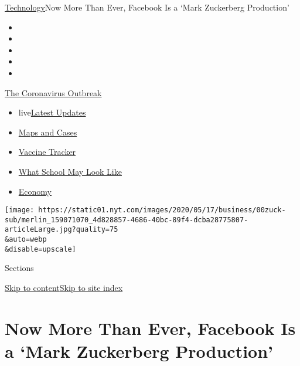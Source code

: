 \href{/section/technology}{Technology}\textbar{}Now More Than Ever,
Facebook Is a `Mark Zuckerberg Production'

\begin{itemize}
\item
\item
\item
\item
\item
\end{itemize}

\href{https://www.nytimes.com/news-event/coronavirus?action=click\&pgtype=Article\&state=default\&region=TOP_BANNER\&context=storylines_menu}{The
Coronavirus Outbreak}

\begin{itemize}
\tightlist
\item
  live\href{https://www.nytimes.com/2020/08/01/world/coronavirus-covid-19.html?action=click\&pgtype=Article\&state=default\&region=TOP_BANNER\&context=storylines_menu}{Latest
  Updates}
\item
  \href{https://www.nytimes.com/interactive/2020/us/coronavirus-us-cases.html?action=click\&pgtype=Article\&state=default\&region=TOP_BANNER\&context=storylines_menu}{Maps
  and Cases}
\item
  \href{https://www.nytimes.com/interactive/2020/science/coronavirus-vaccine-tracker.html?action=click\&pgtype=Article\&state=default\&region=TOP_BANNER\&context=storylines_menu}{Vaccine
  Tracker}
\item
  \href{https://www.nytimes.com/interactive/2020/07/29/us/schools-reopening-coronavirus.html?action=click\&pgtype=Article\&state=default\&region=TOP_BANNER\&context=storylines_menu}{What
  School May Look Like}
\item
  \href{https://www.nytimes.com/live/2020/07/31/business/stock-market-today-coronavirus?action=click\&pgtype=Article\&state=default\&region=TOP_BANNER\&context=storylines_menu}{Economy}
\end{itemize}

\texttt{[image: https://static01.nyt.com/images/2020/05/17/business/00zuck-sub/merlin\_159071070\_4d828857-4686-40bc-89f4-dcba28775807-articleLarge.jpg?quality=75\\\&auto=webp\\\&disable=upscale]}

Sections

\protect\hyperlink{site-content}{Skip to
content}\protect\hyperlink{site-index}{Skip to site index}

\hypertarget{now-more-than-ever-facebook-is-a-mark-zuckerberg-production}{%
\section{Now More Than Ever, Facebook Is a `Mark Zuckerberg
Production'}\label{now-more-than-ever-facebook-is-a-mark-zuckerberg-production}}

